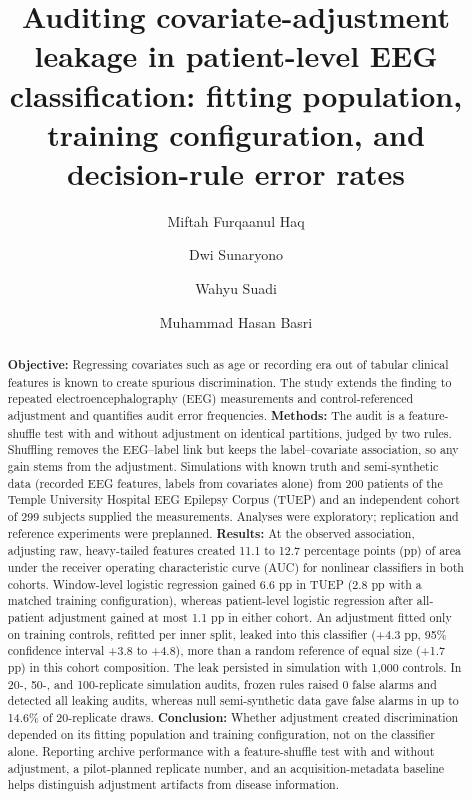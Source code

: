 \documentclass[final,1p,times]{elsarticle}
\begin{document}
\begin{frontmatter}

\title{Auditing covariate-adjustment leakage in patient-level EEG classification: fitting population, training configuration, and decision-rule error rates}

\author[a]{Miftah Furqaanul Haq}
\author[a]{Dwi Sunaryono}
\author[a]{Wahyu Suadi}
\author[a]{Muhammad Hasan Basri}


\begin{abstract}
\textbf{Objective:} Regressing covariates such as age or recording era out of tabular clinical features is known to create spurious discrimination. The study extends the finding to repeated electroencephalography (EEG) measurements and control-referenced adjustment and quantifies audit error frequencies.
\textbf{Methods:} The audit is a feature-shuffle test with and without adjustment on identical partitions, judged by two rules. Shuffling removes the EEG--label link but keeps the label--covariate association, so any gain stems from the adjustment. Simulations with known truth and semi-synthetic data (recorded EEG features, labels from covariates alone) from 200 patients of the Temple University Hospital EEG Epilepsy Corpus (TUEP) and an independent cohort of 299 subjects supplied the measurements. Analyses were exploratory; replication and reference experiments were preplanned.
\textbf{Results:} At the observed association, adjusting raw, heavy-tailed features created 11.1 to 12.7 percentage points (pp) of area under the receiver operating characteristic curve (AUC) for nonlinear classifiers in both cohorts. Window-level logistic regression gained 6.6 pp in TUEP (2.8 pp with a matched training configuration), whereas patient-level logistic regression after all-patient adjustment gained at most 1.1 pp in either cohort. An adjustment fitted only on training controls, refitted per inner split, leaked into this classifier (+4.3 pp, 95\% confidence interval +3.8 to +4.8), more than a random reference of equal size (+1.7 pp) in this cohort composition. The leak persisted in simulation with 1,000 controls. In 20-, 50-, and 100-replicate simulation audits, frozen rules raised 0 false alarms and detected all leaking audits, whereas null semi-synthetic data gave false alarms in up to 14.6\% of 20-replicate draws.
\textbf{Conclusion:} Whether adjustment created discrimination depended on its fitting population and training configuration, not on the classifier alone. Reporting archive performance with a feature-shuffle test with and without adjustment, a pilot-planned replicate number, and an acquisition-metadata baseline helps distinguish adjustment artifacts from disease information.
\end{abstract}


\end{frontmatter}
\end{document}

